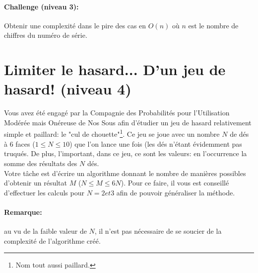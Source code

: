 \documentclass[a4paper]{article}
\begin{document}
\paragraph{Challenge (niveau 3):} Obtenir une complexité dans le pire des cas en $O(n)$ où $n$ est le nombre de chiffres du numéro de série.

\section{Limiter le hasard... D'un jeu de hasard! (niveau 4)}
Vous avez été engagé par la Compagnie des Probabilités pour l'Utilisation Modérée mais Onéreuse de Nos Sous afin d'étudier un jeu de hasard relativement simple et paillard: le "cul de chouette"\footnote{Nom tout aussi paillard.}. Ce jeu se joue avec un nombre $N$ de dés à 6 faces ($1 \leqslant N \leqslant 10$) que l'on lance une fois (les dés n'étant évidemment pas truqués. De plus, l'important, dans ce jeu, ce sont les valeurs: en l'occurrence la somme des résultats des $N$ dés.\\
Votre tâche est d'écrire un algorithme donnant le nombre de manières possibles d'obtenir un résultat $M$ ($N \leqslant M \leqslant 6N$). Pour ce faire, il vous est conseillé d'effectuer les calculs pour $N = 2 et 3$ afin de pouvoir généraliser la méthode.
\paragraph{Remarque:} au vu de la faible valeur de $N$, il n'est pas nécessaire de se soucier de la complexité de l'algorithme créé.
\end{document}
